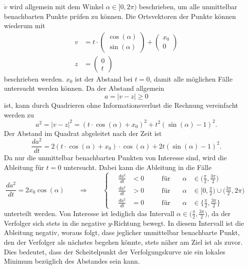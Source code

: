 $\dot{v}$ wird allgemein mit dem Winkel $\alpha \in[ 0, 2\pi)$ beschrieben, um alle unmittelbar benachbarten Punkte prüfen zu können.
Die Ortsvektoren der Punkte können wiederum mit
\begin{align}
	v
	&=
	t\cdot\begin{pmatrix} \cos (\alpha) \\ \sin (\alpha) \end{pmatrix}
	+\begin{pmatrix} x_0 \\ 0 \end{pmatrix}
	\\
	z
	&=
	\begin{pmatrix} 0 \\ t \end{pmatrix}
\end{align}
beschrieben werden.
$x_0$ ist der Abstand bei $t=0$, damit alle möglichen Fälle untersucht werden können.
Da der Abstand allgemein
\begin{equation}
	a
	=
	|v-z|
	\geq
	0
\end{equation}
ist, kann durch Quadrieren ohne Informationsverlust die Rechnung vereinfacht werden zu
\begin{equation}
	a^2
	=
	|v-z|^2
	=
	(t\cdot\cos(\alpha)+x_0)^2+t^2(\sin(\alpha)-1)^2
	\text{.}
\end{equation}
Der Abstand im Quadrat abgeleitet nach der Zeit ist
\begin{equation}
	\frac{d a^2}{d t}
	=
	2(t\cdot\cos (\alpha)+x_0)\cdot\cos(\alpha)+2t(\sin(\alpha)-1)^2
	\text{.}
\end{equation}
Da nur die unmittelbar benachbarten Punkten von Interesse sind, wird die Ableitung für $t=0$ untersucht.
Dabei kann die Ableitung in  die Fälle
\[
	\frac{d a^2}{d t}
	=
	2x_0\cos(\alpha)
\qquad\Rightarrow\qquad
\left\{
\quad
\begin{aligned}
	\frac{d a^2}{d t}
	&<
	0\quad&&\text{für}\quad&\alpha&\in\biggl( \frac{\pi}{2}, \frac{3\pi}{2}\biggr)
	\\
	\frac{d a^2}{d t}
	&>
	0\quad&&\text{für}\quad&\alpha&\in\biggl[0, \frac{\pi}{2}\biggr)\cup\biggl(\frac{3\pi}{2}, 2\pi\biggr)
	\\
	\frac{d a^2}{d t}
	&=
	0\quad&&\text{für}\quad&\alpha&\in\biggl\{ \frac{\pi}{2}, \frac{3\pi}{2}\biggr\}
\end{aligned}
\right.
\]
unterteilt werden.
Von Interesse ist lediglich das Intervall $\alpha\in\bigl(
\frac{\pi}{2}, \frac{3\pi}{2}\bigr)$, da der Verfolger sich stets
in die negative $y$-Richtung bewegt.
In diesem Intervall ist die Ableitung negativ, woraus folgt, dass
jeglicher unmittelbar benachbarte Punkt, den der Verfolger als
nächstes begehen könnte, stets näher am Ziel ist als zuvor.
Dies bedeutet, dass der Scheitelpunkt der Verfolgungskurve nie ein
lokales Minimum bezüglich des Abstandes sein kann.
%

